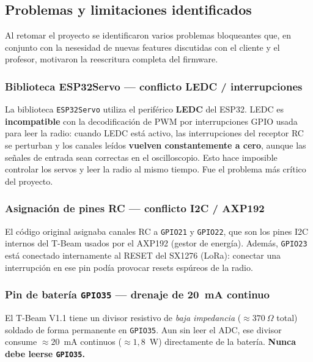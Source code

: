 \documentclass[12pt,a4paper]{article}
\newcommand{\gpio}[1]{\texttt{GPIO#1}}
\begin{document}
\subsection{Problemas y limitaciones identificados}

Al retomar el proyecto se identificaron varios problemas bloqueantes que, en conjunto con la nesesidad de nuevas features discutidas con el cliente y el profesor, motivaron la reescritura completa del firmware.

\subsubsection{Biblioteca ESP32Servo --- conflicto LEDC / interrupciones}

\begin{warningbox}
  La biblioteca \texttt{ESP32Servo} utiliza el perif\'erico \textbf{LEDC} del ESP32.
  LEDC es \textbf{incompatible} con la decodificaci\'on de PWM por interrupciones
  GPIO usada para leer la radio: cuando LEDC est\'a activo, las interrupciones del
  receptor RC se perturban y los canales le\'idos \textbf{vuelven constantemente a
  cero}, aunque las se\~nales de entrada sean correctas en el oscilloscopio. Esto
  hace imposible controlar los servos y leer la radio al mismo tiempo. Fue el
  problema m\'as cr\'itico del proyecto.
\end{warningbox}

\subsubsection{Asignaci\'on de pines RC --- conflicto I2C / AXP192}

\begin{warningbox}
  El c\'odigo original asignaba canales RC a \gpio{21} y \gpio{22}, que son los
  pines I2C internos del T-Beam usados por el AXP192 (gestor de energ\'ia).
  Adem\'as, \gpio{23} est\'a conectado internamente al RESET del SX1276 (LoRa):
  conectar una interrupci\'on en ese pin pod\'ia provocar resets esp\'ureos de la
  radio.
\end{warningbox}

\subsubsection{Pin de bater\'ia \gpio{35} --- drenaje de 20~mA continuo}

El T-Beam V1.1 tiene un divisor resistivo de \emph{baja impedancia}
($\approx370~\Omega$ total) soldado de forma permanente en \gpio{35}. Aun sin leer
el ADC, ese divisor consume $\approx20$~mA continuos ($\approx1{,}8$~W) directamente
de la bater\'ia. \textbf{Nunca debe leerse \gpio{35}.}
\end{document}
